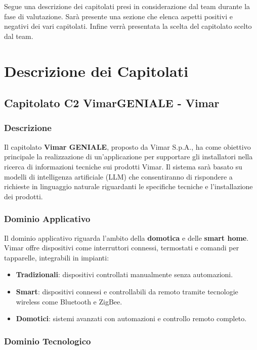 \documentclass{article}
\begin{document}
Segue una descrizione dei capitolati presi in considerazione dal team durante la fase di valutazione.
Sarà presente una sezione che elenca aspetti positivi e negativi dei vari capitolati.
Infine verrà presentata la scelta del capitolato scelto dal team.
\section{Descrizione dei Capitolati}

\subsection{Capitolato C2 VimarGENIALE - Vimar}

\subsubsection{Descrizione}

Il capitolato \textbf{Vimar GENIALE}, proposto da Vimar S.p.A., ha come obiettivo 
principale la realizzazione di un'applicazione per supportare gli installatori nella 
ricerca di informazioni tecniche sui prodotti Vimar. Il sistema sarà basato su modelli 
di intelligenza artificiale (LLM) che consentiranno di 
rispondere a richieste in linguaggio naturale riguardanti le specifiche tecniche e 
l'installazione dei prodotti.

\subsubsection{Dominio Applicativo}

Il dominio applicativo riguarda l'ambito della \textbf{domotica} e delle \textbf{smart home}. 
Vimar offre dispositivi come interruttori connessi, termostati e comandi per tapparelle, 
integrabili in impianti:
\begin{itemize}
    \item \textbf{Tradizionali}: dispositivi controllati manualmente senza automazioni.
    \item \textbf{Smart}: dispositivi connessi e controllabili da remoto tramite 
    tecnologie wireless come Bluetooth e ZigBee.
    \item \textbf{Domotici}: sistemi avanzati con automazioni e controllo remoto completo.
\end{itemize}

\subsubsection{Dominio Tecnologico}
\end{document}
